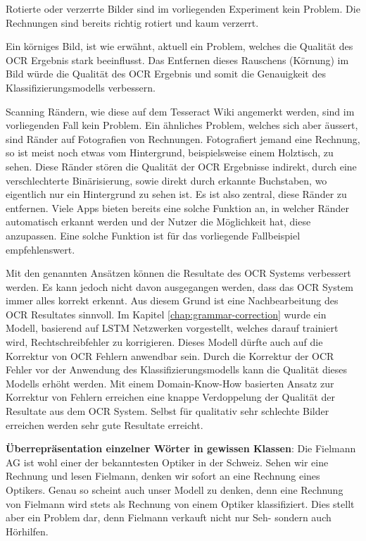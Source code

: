 Rotierte oder verzerrte Bilder sind im vorliegenden Experiment kein Problem. Die Rechnungen sind bereits richtig rotiert und kaum verzerrt.

Ein körniges Bild, ist wie erwähnt, aktuell ein Problem, welches die Qualität des OCR Ergebnis stark beeinflusst. Das Entfernen dieses Rauschens (Körnung) im Bild würde die Qualität des OCR Ergebnis und somit die Genauigkeit des Klassifizierungsmodells verbessern.

Scanning Rändern, wie diese auf dem Tesseract Wiki angemerkt werden, sind im vorliegenden Fall kein Problem. Ein ähnliches Problem, welches sich aber äussert, sind Ränder auf Fotografien von Rechnungen. Fotografiert jemand eine Rechnung, so ist meist noch etwas vom Hintergrund, beispielsweise einem Holztisch, zu sehen. Diese Ränder stören die Qualität der OCR Ergebnisse indirekt, durch eine verschlechterte Binärisierung, sowie direkt durch erkannte Buchstaben, wo eigentlich nur ein Hintergrund zu sehen ist. Es ist also zentral, diese Ränder zu entfernen. Viele Apps bieten bereits eine solche Funktion an, in welcher Ränder automatisch erkannt werden und der Nutzer die Möglichkeit hat, diese anzupassen. Eine solche Funktion ist für das vorliegende Fallbeispiel empfehlenswert.

Mit den genannten Ansätzen können die Resultate des OCR Systems verbessert werden. Es kann jedoch nicht davon ausgegangen werden, dass das OCR System immer alles korrekt erkennt. Aus diesem Grund ist eine Nachbearbeitung des OCR Resultates sinnvoll. Im Kapitel \ref{chap:grammar-correction} wurde ein Modell, basierend auf LSTM Netzwerken vorgestellt, welches darauf trainiert wird, Rechtschreibfehler zu korrigieren. Dieses Modell dürfte auch auf die Korrektur von OCR Fehlern anwendbar sein. Durch die Korrektur der OCR Fehler vor der Anwendung des Klassifizierungsmodells kann die Qualität dieses Modells erhöht werden. Mit einem Domain-Know-How basierten Ansatz zur Korrektur von Fehlern erreichen \textcite{OCRCorrection} eine knappe Verdoppelung der Qualität der Resultate aus dem OCR System. Selbst für qualitativ sehr schlechte Bilder erreichen werden sehr gute Resultate erreicht.


\textbf{Überrepräsentation einzelner Wörter in gewissen Klassen}: Die Fielmann AG ist wohl einer der bekanntesten Optiker in der Schweiz. Sehen wir eine Rechnung und lesen Fielmann, denken wir sofort an eine Rechnung eines Optikers. Genau so scheint auch unser Modell zu denken, denn eine Rechnung von Fielmann wird stets als Rechnung von einem Optiker klassifiziert. Dies stellt aber ein Problem dar, denn Fielmann verkauft nicht nur Seh- sondern auch Hörhilfen.

